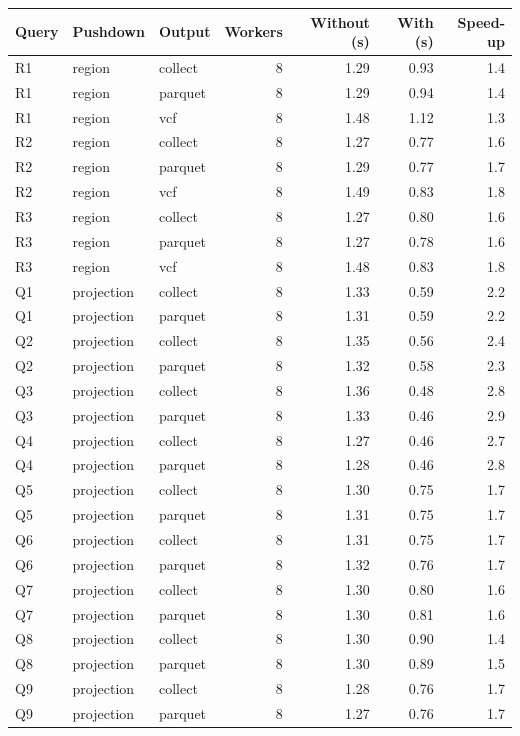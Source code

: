 \begin{tabular}{lllrrrr}
\toprule
Query & Pushdown & Output & Workers & Without (s) & With (s) & Speed-up \\
\midrule
R1 & region & collect & 8 & 1.29 & 0.93 & 1.4 \\
R1 & region & parquet & 8 & 1.29 & 0.94 & 1.4 \\
R1 & region & vcf & 8 & 1.48 & 1.12 & 1.3 \\
R2 & region & collect & 8 & 1.27 & 0.77 & 1.6 \\
R2 & region & parquet & 8 & 1.29 & 0.77 & 1.7 \\
R2 & region & vcf & 8 & 1.49 & 0.83 & 1.8 \\
R3 & region & collect & 8 & 1.27 & 0.80 & 1.6 \\
R3 & region & parquet & 8 & 1.27 & 0.78 & 1.6 \\
R3 & region & vcf & 8 & 1.48 & 0.83 & 1.8 \\
Q1 & projection & collect & 8 & 1.33 & 0.59 & 2.2 \\
Q1 & projection & parquet & 8 & 1.31 & 0.59 & 2.2 \\
Q2 & projection & collect & 8 & 1.35 & 0.56 & 2.4 \\
Q2 & projection & parquet & 8 & 1.32 & 0.58 & 2.3 \\
Q3 & projection & collect & 8 & 1.36 & 0.48 & 2.8 \\
Q3 & projection & parquet & 8 & 1.33 & 0.46 & 2.9 \\
Q4 & projection & collect & 8 & 1.27 & 0.46 & 2.7 \\
Q4 & projection & parquet & 8 & 1.28 & 0.46 & 2.8 \\
Q5 & projection & collect & 8 & 1.30 & 0.75 & 1.7 \\
Q5 & projection & parquet & 8 & 1.31 & 0.75 & 1.7 \\
Q6 & projection & collect & 8 & 1.31 & 0.75 & 1.7 \\
Q6 & projection & parquet & 8 & 1.32 & 0.76 & 1.7 \\
Q7 & projection & collect & 8 & 1.30 & 0.80 & 1.6 \\
Q7 & projection & parquet & 8 & 1.30 & 0.81 & 1.6 \\
Q8 & projection & collect & 8 & 1.30 & 0.90 & 1.4 \\
Q8 & projection & parquet & 8 & 1.30 & 0.89 & 1.5 \\
Q9 & projection & collect & 8 & 1.28 & 0.76 & 1.7 \\
Q9 & projection & parquet & 8 & 1.27 & 0.76 & 1.7 \\

\end{tabular}
